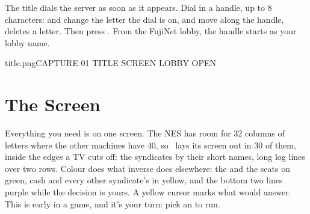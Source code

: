 \documentclass[12pt,letterpaper]{article}
\begin{document}
The title dials the server as soon as it appears. Dial in a handle, up to 8 characters:  and 
change the letter the dial is on,  and  move along the handle,  deletes a letter. Then
press . From the FujiNet lobby, the handle starts as your lobby name.

\begin{capture}{title.png}{CAPTURE 01 \quad TITLE SCREEN \quad LOBBY OPEN}
\end{capture}

\begin{legend}
\end{legend}

\renewcommand{\secstatus}{30 COLUMNS \quad // \quad COLOUR \quad // \quad THE CURSOR}
\chapter{The Screen}
\begin{sloppypar}
Everything you need is on one screen. The NES has room for 32 columns of letters where the other machines have
40, so \game\ lays its screen out in 30 of them, inside the edges a TV cuts off: the syndicates by their short
names, long log lines over two rows. Colour does what inverse does elsewhere: the  and the seats on green,
cash and every other syndicate's  in yellow, and the bottom two lines purple while the decision is yours.
A yellow cursor marks what  would answer. This is early in a game, and it's your turn: pick an  to run.
\end{sloppypar}
\end{document}
